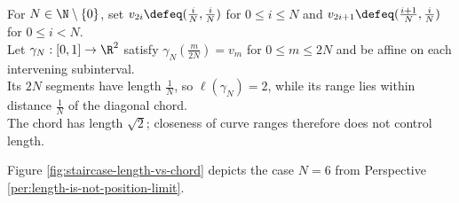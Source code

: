 \begin{perspective} \label{per:length-is-not-position-limit} \\
For $N\in\N\setminus\{0\}$, set $v_{2i}\defeq(\frac{i}{N},\frac{i}{N})$ for $0\leq i\leq N$ and $v_{2i+1}\defeq(\frac{i+1}{N},\frac{i}{N})$ for $0\leq i<N$.\\
Let $\gamma_N:[0,1]\to\R^2$ satisfy $\gamma_N(\frac{m}{2N})=v_m$ for $0\leq m\leq2N$ and be affine on each intervening subinterval.\\
Its $2N$ segments have length $\frac{1}{N}$, so $\ell(\gamma_N)=2$, while its range lies within distance $\frac{1}{N}$ of the diagonal chord.\\
The chord has length $\sqrt{2}$; closeness of curve ranges therefore does not control length.
\end{perspective}

\noindent Figure \ref{fig:staircase-length-vs-chord} depicts the case $N=6$ from Perspective \ref{per:length-is-not-position-limit}.
\begin{illustrationfigure}[H]
  \centering
  
  \caption{The six-step staircase has length $2$, while the diagonal chord has length $\sqrt{2}$.}
  \label{fig:staircase-length-vs-chord}
\end{illustrationfigure}

